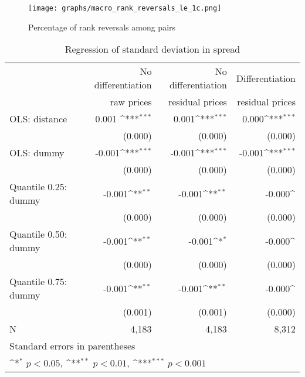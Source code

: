 \documentclass[english]{article}
\begin{document}
{{\begin{figure}[!h]
    \caption{Percentage of rank reversals among pairs}
	\centering
		\texttt{[image: graphs/macro\_rank\_reversals\_le\_1c.png]}
\end{figure}

\begin{table}[!htbp]\centering
\def\sym#1{\ifmmode^{#1}\else\(^{#1}\)\fi}
\caption{Regression of standard deviation in spread}
\begin{tabular}{lrrr}
\hline
\hline
{} & No differentiation & No differentiation & Differentiation \\
{} & raw prices & residual prices & residual prices \\
\hline
OLS: distance &  0.001 \sym{***}&      0.001\sym{***}&       0.000\sym{***}\\
{} &     (0.000)         &     (0.000)         &     (0.000)   \\
OLS: dummy &  -0.001\sym{***}&      -0.001\sym{***}&     -0.001\sym{***}\\
{} &    (0.000)     &     (0.000)         &     (0.000) \\
Quantile 0.25: dummy     &       -0.001\sym{**}&       -0.001\sym{**}&       -0.000\sym{}\\
{} &     (0.000)       &     (0.000)         &     (0.000)  \\
Quantile 0.50: dummy     &       -0.001\sym{**}&      -0.001\sym{*}&       -0.000\sym{}\\
{} &  (0.000)         &     (0.000)         &     (0.000)    \\
Quantile 0.75: dummy     &       -0.001\sym{**}&     -0.001\sym{**}&       -0.000\sym{}\\
{} &     (0.001)         &     (0.001)         &     (0.000)   \\
\hline
N      &     4,183         &     4,183      &     8,312    \\
\hline\hline
\multicolumn{4}{l}{\footnotesize Standard errors in parentheses}\\
\multicolumn{4}{l}{\footnotesize \sym{*} \(p<0.05\), \sym{**} \(p<0.01\), \sym{***} \(p<0.001\)}\\
\end{tabular}
\end{table}

}}
\end{document}
